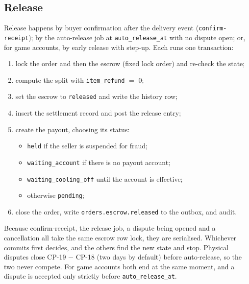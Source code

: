 \documentclass[11pt,a4paper]{article}
\begin{document}
\subsection{Release}
\label{sec:release}
Release happens by buyer confirmation after the delivery event (\texttt{confirm-receipt}); by the auto-release job at \texttt{auto\_release\_at} with no dispute open; or, for game accounts, by early release with step-up. Each runs one transaction:
\begin{enumerate}[nosep]
  \item lock the order and then the escrow (fixed lock order) and re-check the state;
  \item compute the split with \texttt{item\_refund} $=$ 0;
  \item set the escrow to \texttt{released} and write the history row;
  \item insert the settlement record and post the release entry;
  \item create the payout, choosing its status:
  \begin{itemize}[nosep]
    \item \texttt{held} if the seller is suspended for fraud;
    \item \texttt{waiting\_account} if there is no payout account;
    \item \texttt{waiting\_cooling\_off} until the account is effective;
    \item otherwise \texttt{pending};
  \end{itemize}
  \item close the order, write \texttt{orders.escrow.released} to the outbox, and audit.
\end{enumerate}
Because confirm-receipt, the release job, a dispute being opened and a cancellation all take the same escrow row lock, they are serialised. Whichever commits first decides, and the others find the new state and stop. Physical disputes close CP-19 $-$ CP-18 (two days by default) before auto-release, so the two never compete. For game accounts both end at the same moment, and a dispute is accepted only strictly before \texttt{auto\_release\_at}.
\end{document}
